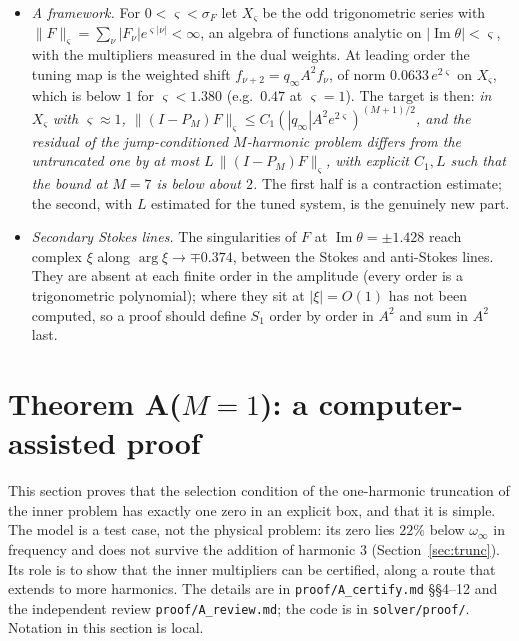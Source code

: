 \documentclass{amsart}
\numberwithin{equation}{section}
\theoremstyle{plain}
\theoremstyle{definition}
\theoremstyle{remark}
\newcommand{\winf}{\omega_\infty}
\newcommand{\im}{\operatorname{Im}}
\newcommand{\repo}[1]{\texttt{#1}}
\begin{document}
\begin{itemize}
in the harmonic-1 residual $r_1$, above $M = 7$ at $0.2$--$0.35$, and above $M = 9$ at about $0.015$; a certified box of radius
$10^{-3}$ needs the tail below about $4$, so with $M = 7$ explicit the margin is about $13$. Even a proven ratio of $0.25$ per
pair would suffice.
\item \emph{A framework.} For $0 < \varsigma < \sigma_F$ let $X_\varsigma$ be the odd trigonometric series with
$\|F\|_\varsigma = \sum_\nu|F_\nu|e^{\varsigma|\nu|} < \infty$, an algebra of functions analytic on $|\im\theta| < \varsigma$, with
the multipliers measured in the dual weights. At leading order the tuning map is the weighted shift $f_{\nu+2} = q_\infty A^2f_\nu$,
of norm $0.0633\,e^{2\varsigma}$ on $X_\varsigma$, which is below $1$ for $\varsigma < 1.380$ (e.g.\ $0.47$ at $\varsigma = 1$). The target
is then: \emph{in $X_\varsigma$ with $\varsigma \approx 1$, $\|(I - P_M)F\|_\varsigma \le C_1(|q_\infty|A^2e^{2\varsigma})^{(M+1)/2}$, and the
residual of the jump-conditioned $M$-harmonic problem differs from the untruncated one by at most
$L\,\|(I - P_M)F\|_\varsigma$, with explicit $C_1, L$ such that the bound at $M = 7$ is below about $2$.} The first half is a
contraction estimate; the second, with $L$ estimated for the tuned system, is the genuinely new part.
\item \emph{Secondary Stokes lines.} The singularities of $F$ at $\im\theta = \pm1.428$ reach complex $\xi$ along
$\arg\xi \to \mp0.374$, between the Stokes and anti-Stokes lines. They are absent at each finite order in the amplitude (every
order is a trigonometric polynomial); where they sit at $|\xi| = O(1)$ has not been computed, so a proof should define $S_1$
order by order in $A^2$ and sum in $A^2$ last.
\end{itemize}

\section{Theorem A(\texorpdfstring{$M=1$}{M=1}): a computer-assisted proof}
\label{sec:thmA}

This section proves that the selection condition of the one-harmonic truncation of the inner problem has exactly one
zero in an explicit box, and that it is simple. The model is a test case, not the physical problem: its zero lies
$22\%$ below $\winf$ in frequency and does not survive the addition of harmonic $3$ (Section~\ref{sec:trunc}). Its role is to
show that the inner multipliers can be certified, along a route that extends to more harmonics. The details are in
\repo{proof/A\_certify.md} \S\S4--12 and the independent review \repo{proof/A\_review.md}; the code is in
\repo{solver/proof/}. Notation in this section is local.
\end{document}
